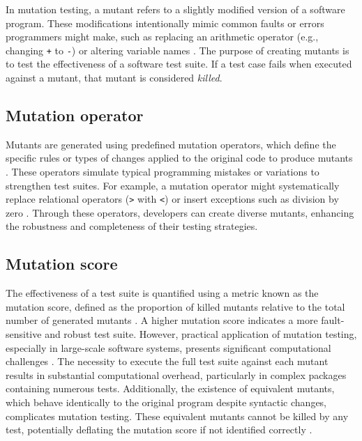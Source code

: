 In mutation testing, a mutant refers to a slightly modified version of a software program. These modifications intentionally mimic common faults or errors programmers might make, such as replacing an arithmetic operator (e.g., changing \texttt{+} to \texttt{-}) or altering variable names \cite{jia2011analysis}. The purpose of creating mutants is to test the effectiveness of a software test suite. If a test case fails when executed against a mutant, that mutant is considered \textit{killed}. 

\subsection{Mutation operator}

Mutants are generated using predefined mutation operators, which define the specific rules or types of changes applied to the original code to produce mutants \cite{offutt1996practical}. These operators simulate typical programming mistakes or variations to strengthen test suites. For example, a mutation operator might systematically replace relational operators (\texttt{>} with \texttt{<}) or insert exceptions such as division by zero \cite{jia2011analysis}. Through these operators, developers can create diverse mutants, enhancing the robustness and completeness of their testing strategies.

\subsection{Mutation score}

The effectiveness of a test suite is quantified using a metric known as the mutation score, defined as the proportion of killed mutants relative to the total number of generated mutants \cite{jia2011analysis}. A higher mutation score indicates a more fault-sensitive and robust test suite. However, practical application of mutation testing, especially in large-scale software systems, presents significant computational challenges \cite{petrovic2018industrial}. The necessity to execute the full test suite against each mutant results in substantial computational overhead, particularly in complex packages containing numerous tests. Additionally, the existence of equivalent mutants, which behave identically to the original program despite syntactic changes, complicates mutation testing. These equivalent mutants cannot be killed by any test, potentially deflating the mutation score if not identified correctly \cite{offutt1996practical}.

